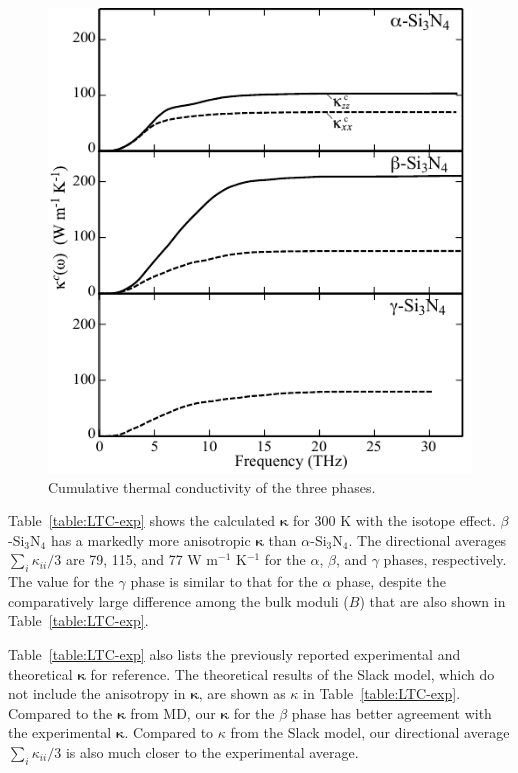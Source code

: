 \documentclass[twocolumn,amsmath,amssymb,a4paper,prb,superscriptaddress,floatfix]{revtex4-1}
\begin{document}
\begin{figure}[H]
	 \begin{center}
		   \includegraphics[width=0.90\linewidth]{Figure_kaccum_for_alpha_beta_gamma_phases.pdf}
		   \caption{Cumulative thermal conductivity of the three phases. 
		   \label{fig:kaccum} }
    \end{center}
\end{figure}
Table~\ref{table:LTC-exp} shows the calculated
$\boldsymbol{\kappa}$ for 300 K with the isotope effect. $\beta$-Si$_3$N$_4$ has a markedly more
anisotropic $\boldsymbol{\kappa}$ than $\alpha$-Si$_3$N$_4$.  The directional
averages $\sum_i \kappa_{ii}/3$  are 79, 115,  and 77 W m$^{-1}$ K$^{-1}$ for the
$\alpha$, $\beta$, and $\gamma$ phases, respectively. The value for the
$\gamma$ phase is similar to that for the $\alpha$ phase, despite the
comparatively large difference among the bulk moduli ($B$) that are also shown
in Table~\ref{table:LTC-exp}.   

Table~\ref{table:LTC-exp} also lists the previously reported
experimental\cite{li} and theoretical\cite{hirosaki-md} $\boldsymbol{\kappa}$
for reference. The theoretical results\cite{morelli} of the Slack model, which
do not include the anisotropy in $\boldsymbol{\kappa}$, are shown as $\kappa$ in
Table~\ref{table:LTC-exp}. Compared to the $\boldsymbol{\kappa}$ from
MD\cite{hirosaki-md}, our $\boldsymbol{\kappa}$ for the $\beta$ phase has better
agreement with the experimental $\boldsymbol{\kappa}$.  Compared to $\kappa$
from the Slack model, our directional average $\sum_i \kappa_{ii}/3$ is also
much closer to the experimental average. 
\end{document}

